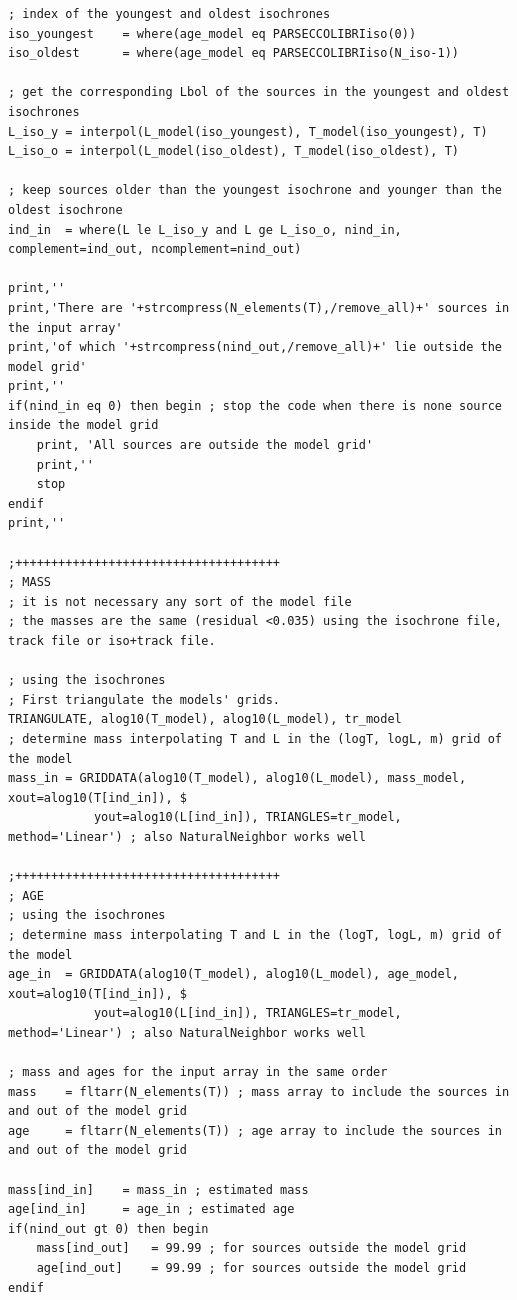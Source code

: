 \documentclass[12pt]{article}
\begin{document}
{\begin{Verbatim}[tabsize=4]
; index of the youngest and oldest isochrones
iso_youngest	= where(age_model eq PARSECCOLIBRIiso(0))
iso_oldest		= where(age_model eq PARSECCOLIBRIiso(N_iso-1))

; get the corresponding Lbol of the sources in the youngest and oldest isochrones
L_iso_y	= interpol(L_model(iso_youngest), T_model(iso_youngest), T)
L_iso_o	= interpol(L_model(iso_oldest), T_model(iso_oldest), T)

; keep sources older than the youngest isochrone and younger than the oldest isochrone
ind_in	= where(L le L_iso_y and L ge L_iso_o, nind_in, complement=ind_out, ncomplement=nind_out)

print,''
print,'There are '+strcompress(N_elements(T),/remove_all)+' sources in the input array'
print,'of which '+strcompress(nind_out,/remove_all)+' lie outside the model grid'
print,''
if(nind_in eq 0) then begin ; stop the code when there is none source inside the model grid
	print, 'All sources are outside the model grid'
	print,''
	stop
endif
print,''

;+++++++++++++++++++++++++++++++++++++
; MASS
; it is not necessary any sort of the model file
; the masses are the same (residual <0.035) using the isochrone file, track file or iso+track file.

; using the isochrones
; First triangulate the models' grids.
TRIANGULATE, alog10(T_model), alog10(L_model), tr_model
; determine mass interpolating T and L in the (logT, logL, m) grid of the model
mass_in	= GRIDDATA(alog10(T_model), alog10(L_model), mass_model, xout=alog10(T[ind_in]), $ 
			yout=alog10(L[ind_in]), TRIANGLES=tr_model, method='Linear') ; also NaturalNeighbor works well

;+++++++++++++++++++++++++++++++++++++
; AGE
; using the isochrones
; determine mass interpolating T and L in the (logT, logL, m) grid of the model
age_in	= GRIDDATA(alog10(T_model), alog10(L_model), age_model, xout=alog10(T[ind_in]), $ 
			yout=alog10(L[ind_in]), TRIANGLES=tr_model, method='Linear') ; also NaturalNeighbor works well

; mass and ages for the input array in the same order
mass	= fltarr(N_elements(T)) ; mass array to include the sources in and out of the model grid
age		= fltarr(N_elements(T)) ; age array to include the sources in and out of the model grid

mass[ind_in]	= mass_in ; estimated mass
age[ind_in]		= age_in ; estimated age
if(nind_out gt 0) then begin
	mass[ind_out]	= 99.99 ; for sources outside the model grid
	age[ind_out]	= 99.99 ; for sources outside the model grid
endif


\end{Verbatim}}
\end{document}

